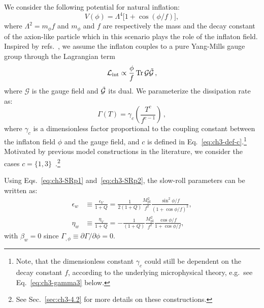 We consider the following potential for natural inflation:
\begin{equation}
    V(\phi)=\Lambda^4 \Big[ 1+ \cos(\phi/f)\Big], \label{eq:ch3-3.1}
\end{equation}
where $\Lambda^2=m_\phi f$ and $m_\phi$ and $f$ are respectively the mass and the decay constant of the axion-like particle which in this scenario plays the role of the inflaton field. Inspired by refs.~\cite{Berghaus:2019whh, Berghaus:2020ekh, DeRocco:2021rzv}, we assume the inflaton couples to a pure Yang-Mills gauge group through the Lagrangian term
\begin{equation}
    \mathcal{L}_{\mathrm{int}} \propto \frac{\phi}{f} \,\mathrm{Tr}\,\mathcal{G}\Tilde{\mathcal{G}}\,,
\end{equation}
where $\mathcal G$ is the gauge field and $\Tilde{\mathcal{G}}$ its dual. We parameterize the dissipation rate as:
\begin{equation}
    \label{eq:ch3-tempdepofdissipation}
    \Gamma(T)=\gamma_c \left(\frac{T^c}{f^{c-1}}\right)\,,
\end{equation}
where $\gamma_c$ is a dimensionless factor proportional to the coupling constant between the inflaton field $\phi$ and the gauge field, and $c$ is defined in Eq.~\ref{eq:ch3-def-c}.\footnote{Note, that the dimensionless constant $\gamma_c$ could still be dependent on the decay constant $f$, according to the underlying microphysical theory, e.g.\ see Eq.~\ref{eq:ch3-gamma3} below.} Motivated by previous model constructions in the literature, we consider the cases $c=\{1,3\}$~\cite{Berghaus:2019whh, Berghaus:2020ekh}.\footnote{See Sec.~\ref{sec:ch3-4.2} for more details on these constructions.}

Using Eqs.~\ref{eq:ch3-SRp1} and~\ref{eq:ch3-SRp2}, the slow-roll parameters can be written as:
\begin{align}
    \epsilon_{w} &\equiv \frac{\epsilon_V}{1+Q}=\frac{1}{2(1+Q)} \frac{M_{\mathrm{pl}}^{2}}{f^{2}} \frac{\sin ^{2} \phi / f}{(1+\cos \phi / f)^{2}}, \label{eq:ch3-SRp11} \\
    \eta_{w} &\equiv \frac{\eta_V}{1+Q}=-\frac{1}{(1+Q)} \frac{M_{\mathrm{pl}}^{2}}{f^{2}} \frac{\cos \phi / f}{1+\cos \phi / f}, \label{eq:ch3-SRp22}
\end{align}
with $\beta_{w}=0$ since $\Gamma_{,\phi} \equiv \partial \Gamma/\partial \phi = 0$.

